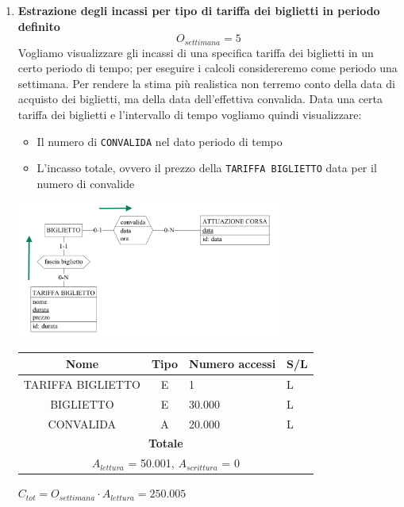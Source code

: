 \documentclass[12pt,a4paper]{report}
\begin{document}
\begin{enumerate}[label=\textbf{\arabic*)}]
    \item\textbf{Estrazione degli incassi per tipo di tariffa dei biglietti in periodo definito} \label{op10} \\
    \[ {O_{settimana} = 5} \]
    Vogliamo visualizzare gli incassi di una specifica tariffa dei biglietti in un certo periodo di tempo; per eseguire i calcoli considereremo come periodo una settimana. Per rendere la stima più realistica non terremo conto della data di acquisto dei biglietti, ma della data dell'effettiva convalida.
    Data una certa tariffa dei biglietti e l'intervallo di tempo vogliamo quindi visualizzare:
    \begin{itemize}
	\renewcommand\labelitemi{--}
    \item Il numero di \texttt{CONVALIDA} nel dato periodo di tempo
    \item L'incasso totale, ovvero il prezzo della \texttt{TARIFFA BIGLIETTO} data per il numero di convalide
    \end{itemize}
    \begin{center}
    \includegraphics[width=0.7\textwidth]{VisualIncassoPerTariffa}
    \end{center}
    \begin{table}[H]
    \centering
    \begin{tabular}{|c|c|l|l|}
    \hline
    \textbf{Nome} & \textbf{Tipo} & \textbf{Numero accessi} & \textbf{S/L} \\
    \hline
    TARIFFA BIGLIETTO & E & 1 & L \\
    \hline
    BIGLIETTO & E & 30.000 & L \\
    \hline
    CONVALIDA & A & 20.000 & L \\
    \hline
    \multicolumn{4}{c}{\textbf{Totale}} \\
    \multicolumn{4}{c}{${A_{lettura}}$ = 50.001, ${A_{scrittura}}$ = 0} \\
    \hline
    \end{tabular}
    \end{table}
    \begin{center}
    ${C_{tot} = {O_{settimana}}\cdot{A_{lettura}}= 250.005}$
    \end{center}


\end{enumerate}
\end{document}
